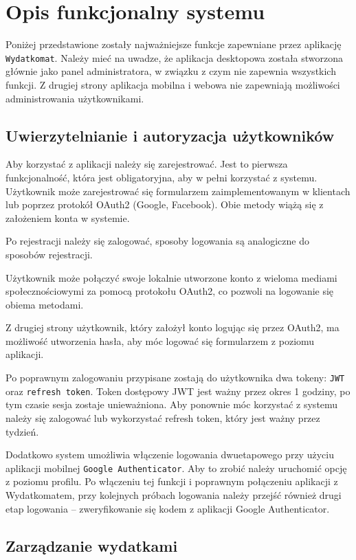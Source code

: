 \chapter{Opis funkcjonalny systemu}

Poniżej przedstawione zostały najważniejsze funkcje zapewniane przez aplikację \verb|Wydatkomat|. Należy mieć na uwadze, że aplikacja desktopowa została stworzona głównie jako panel administratora, w związku z czym nie zapewnia wszystkich funkcji. Z drugiej strony aplikacja mobilna i webowa nie zapewniają możliwości administrowania użytkownikami.

\section{Uwierzytelnianie i autoryzacja użytkowników}

Aby korzystać z aplikacji należy się zarejestrować. Jest to pierwsza funkcjonalność, która jest obligatoryjna, aby w pełni korzystać z systemu. Użytkownik może zarejestrować się formularzem zaimplementowanym w klientach lub poprzez protokół OAuth2 (Google, Facebook). Obie metody wiążą się z założeniem konta w systemie.

Po rejestracji należy się zalogować, sposoby logowania są analogiczne do sposobów rejestracji.

Użytkownik może połączyć swoje lokalnie utworzone konto z wieloma mediami społecznościowymi za pomocą protokołu OAuth2, co pozwoli na logowanie się obiema metodami.

Z drugiej strony użytkownik, który założył konto logując się przez OAuth2, ma możliwość utworzenia hasła, aby móc logować się formularzem z poziomu aplikacji.

Po poprawnym zalogowaniu przypisane zostają do użytkownika dwa tokeny: \verb|JWT| oraz \verb|refresh token|. Token dostępowy JWT jest ważny przez okres 1 godziny, po tym czasie sesja zostaje unieważniona. Aby ponownie móc korzystać z systemu należy się zalogować lub wykorzystać refresh token, który jest ważny przez tydzień.

Dodatkowo system umożliwia włączenie logowania dwuetapowego przy użyciu aplikacji mobilnej \verb|Google Authenticator|. Aby to zrobić należy uruchomić opcję z poziomu profilu. Po włączeniu tej funkcji i poprawnym połączeniu aplikacji z Wydatkomatem, przy kolejnych próbach logowania należy przejść również drugi etap logowania -- zweryfikowanie się kodem z aplikacji Google Authenticator.

\section{Zarządzanie wydatkami}

